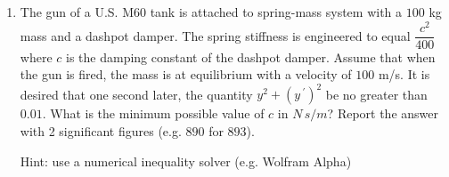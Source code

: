 \documentclass{ximera}
\begin{document}
\begin{enumerate}[label=(\arabic*)]

\item The gun of a U.S. M60 tank is attached to spring-mass system with a $100$ kg mass and a dashpot damper.  The spring stiffness is engineered to equal $\dfrac{c^2}{400}$ where $c$ is the damping constant of the dashpot damper.  Assume that when the gun is fired, the mass is at equilibrium with a velocity of $100$ m/s.  It is desired that one second later, the quantity $y^2+(y\,^{\prime})^2$ be no greater than $0.01$.  What is the minimum possible value of $c$ in $N\,s/m$?  Report the answer with 2 significant figures (e.g. $890$ for $893$).

Hint: use a numerical inequality solver (e.g. Wolfram Alpha)
    
    
    


\end{enumerate}
\end{document}
